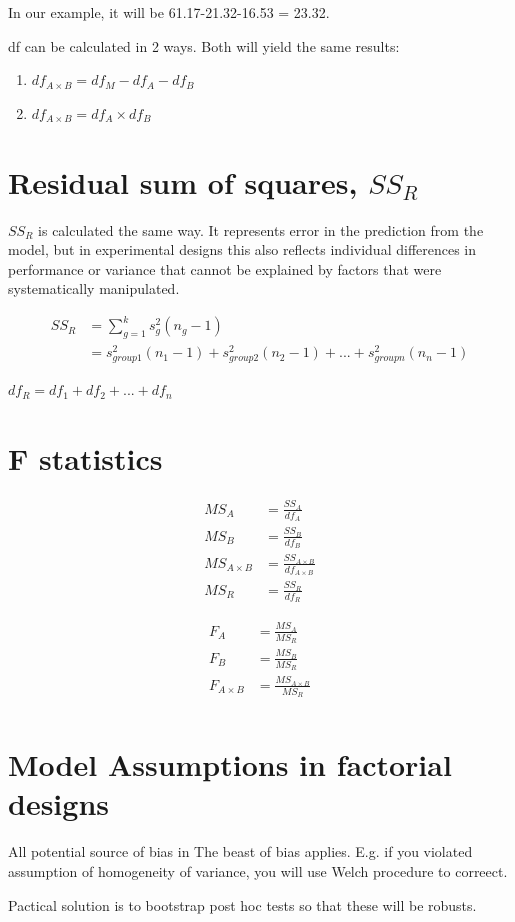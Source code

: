 In our example, it will be 61.17-21.32-16.53 = 23.32.

df can be calculated in 2 ways. Both will yield the same results:
\begin{enumerate}
\item $df_{A \times B} = df_M - df_A - df_B$
\item $df_{A \times B} = df_A \times df_B$
\end{enumerate}

\section{Residual sum of squares, $SS_R$}
$SS_R$ is calculated the same way. It represents error in the prediction from the model, but in experimental designs this also reflects individual differences in performance or variance that cannot be explained by factors that were systematically manipulated.

\begin{equation}
\begin{split}
SS_R & = \sum^k_{g=1} s^2_g (n_g - 1) \\
& = s^2_{group1}(n_1-1) + s^2_{group2}(n_2-1) + ... + s^2_{groupn}(n_n-1)
\end{split}
\end{equation}

$df_R = df_1 + df_2 + ... + df_n$

\section{F statistics}
\begin{equation}
\begin{split}
MS_A &= \frac{SS_A}{df_A}\\
MS_B &= \frac{SS_B}{df_B}\\
MS_{A \times B} &= \frac{SS_{A \times B}}{df_{A \times B}}\\
MS_R &= \frac{SS_R}{df_R}
\end{split}
\end{equation}

\begin{equation}
\begin{split}
F_A &= \frac{MS_A}{MS_R}\\
F_B &= \frac{MS_B}{MS_R}\\
F_{A \times B} &= \frac{MS_{A \times B}}{MS_R}\\
\end{split}
\end{equation}


\section{Model Assumptions in factorial designs}

All potential source of bias in The beast of bias applies. E.g. if you violated assumption of homogeneity of variance, you will use Welch procedure to correect. 

Pactical solution is to bootstrap post hoc tests so that these will be robusts.

